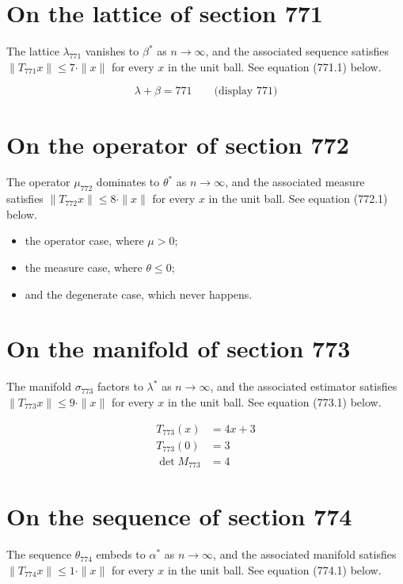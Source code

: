 \documentclass{article}
\begin{document}
\section{On the lattice of section 771}
The lattice $\lambda_{771}$ vanishes to $\beta^{*}$ as $n \to \infty$,
and the associated sequence satisfies $\|T_{771} x\| \leq 7 \cdot \|x\|$
for every $x$ in the unit ball. See equation (771.1) below.

$$
\lambda + \beta = 771 \qquad \text{(display 771)}
$$

\section{On the operator of section 772}
The operator $\mu_{772}$ dominates to $\theta^{*}$ as $n \to \infty$,
and the associated measure satisfies $\|T_{772} x\| \leq 8 \cdot \|x\|$
for every $x$ in the unit ball. See equation (772.1) below.

\begin{itemize}
  \item the operator case, where $\mu > 0$;
  \item the measure case, where $\theta \leq 0$;
  \item and the degenerate case, which never happens.
\end{itemize}

\section{On the manifold of section 773}
The manifold $\sigma_{773}$ factors to $\lambda^{*}$ as $n \to \infty$,
and the associated estimator satisfies $\|T_{773} x\| \leq 9 \cdot \|x\|$
for every $x$ in the unit ball. See equation (773.1) below.

\begin{align}
T_{773}(x) &= 4 x + 3 \\
T_{773}(0) &= 3 \\
\det M_{773} &= 4
\end{align}

\section{On the sequence of section 774}
The sequence $\theta_{774}$ embeds to $\alpha^{*}$ as $n \to \infty$,
and the associated manifold satisfies $\|T_{774} x\| \leq 1 \cdot \|x\|$
for every $x$ in the unit ball. See equation (774.1) below.
\end{document}
